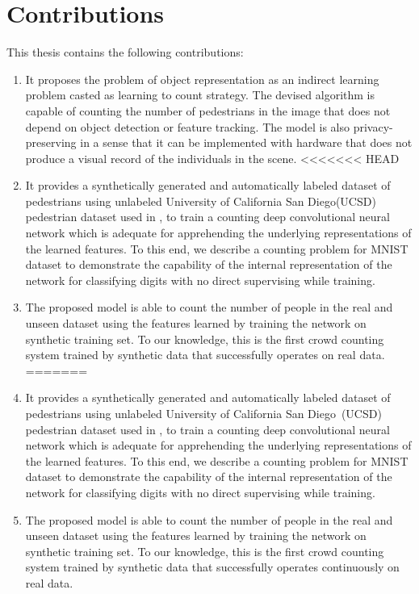 \section{Contributions}
This thesis contains the following contributions:
\begin{enumerate}
	\item It proposes the problem of object representation as an indirect learning problem casted as learning to count strategy. The devised algorithm is capable of counting the number of pedestrians in the image that does not depend on object detection or feature tracking. The model is also privacy-preserving in a sense that it can be implemented with hardware that does not produce a visual record of the individuals in the scene. 
<<<<<<< HEAD
	\item It provides a synthetically generated and automatically labeled dataset of pedestrians using unlabeled University of California San Diego(UCSD) pedestrian dataset used in \cite{mahadevan2010anomaly}, to train a counting deep convolutional neural network which is adequate for apprehending the underlying representations of the learned features. To this end, we describe a counting problem for MNIST dataset to demonstrate the capability of the internal representation of the network for classifying digits with no direct supervising while training. 
	\item The proposed model is able to count the number of people in the real and unseen dataset using the features learned by training the network on synthetic training set. To our knowledge, this is the first crowd counting system trained by synthetic data that successfully operates on real data. 
=======
	\item It provides a synthetically generated and automatically labeled dataset of pedestrians using unlabeled University of California San Diego~(UCSD) pedestrian dataset used in \cite{mahadevan2010anomaly}, to train a counting deep convolutional neural network which is adequate for apprehending the underlying representations of the learned features. To this end, we describe a counting problem for MNIST dataset to demonstrate the capability of the internal representation of the network for classifying digits with no direct supervising while training. 
	\item The proposed model is able to count the number of people in the real and unseen dataset using the features learned by training the network on synthetic training set. To our knowledge, this is the first crowd counting system trained by synthetic data that successfully operates continuously on real data. 

\end{enumerate}
